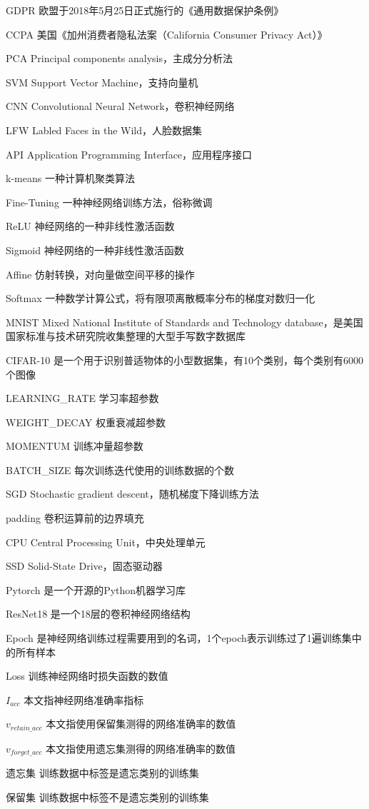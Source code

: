 
\begin{denotation}[3cm]
  \item[GDPR] 欧盟于2018年5月25日正式施行的《通用数据保护条例》
  \item[CCPA] 美国《加州消费者隐私法案（California Consumer Privacy Act）》 
  \item[PCA] Principal components analysis，主成分分析法
  \item[SVM] Support Vector Machine，支持向量机
  \item[CNN] Convolutional Neural Network，卷积神经网络
  \item[LFW] Labled Faces in the Wild，人脸数据集
  \item[API] Application Programming Interface，应用程序接口
  \item[k-means] 一种计算机聚类算法
  \item[Fine-Tuning] 一种神经网络训练方法，俗称微调
  \item[ReLU] 神经网络的一种非线性激活函数
  \item[Sigmoid] 神经网络的一种非线性激活函数
  \item[Affine] 仿射转换，对向量做空间平移的操作
  \item[Softmax] 一种数学计算公式，将有限项离散概率分布的梯度对数归一化
  \item[MNIST] Mixed National Institute of Standards and Technology database，是美国国家标准与技术研究院收集整理的大型手写数字数据库
  \item[CIFAR-10] 是一个用于识别普适物体的小型数据集，有10个类别，每个类别有6000个图像
  \item[LEARNING\_RATE] 学习率超参数
  \item[WEIGHT\_DECAY] 权重衰减超参数
  \item[MOMENTUM] 训练冲量超参数  
  \item[BATCH\_SIZE] 每次训练迭代使用的训练数据的个数
  \item[SGD]   Stochastic gradient descent，随机梯度下降训练方法
  \item[padding] 卷积运算前的边界填充
  \item[CPU] Central Processing Unit，中央处理单元
  \item[SSD] Solid-State Drive，固态驱动器
  \item[Pytorch] 是一个开源的Python机器学习库
  \item[ResNet18] 是一个18层的卷积神经网络结构
  \item[Epoch] 是神经网络训练过程需要用到的名词，1个epoch表示训练过了1遍训练集中的所有样本
  \item[Loss] 训练神经网络时损失函数的数值
  \item[$I_{acc}$] 本文指神经网络准确率指标
  \item[$v_{retain\_acc}$] 本文指使用保留集测得的网络准确率的数值
  \item[$v_{forget\_acc}$] 本文指使用遗忘集测得的网络准确率的数值
  \item[遗忘集] 训练数据中标签是遗忘类别的训练集 
  \item[保留集]  训练数据中标签不是遗忘类别的训练集
\end{denotation}



